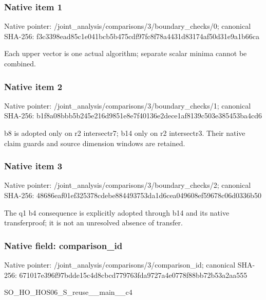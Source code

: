 \documentclass[10pt,a4paper]{article}
\begin{document}
\subsubsection{Native item 1}
Native pointer: /joint\_\allowbreak{}analysis/comparisons/3/boundary\_\allowbreak{}checks/0; canonical SHA-256: f3c3398ead85c1e041bcb5b475cdf97fc8f78a4431d83174af50d31e9a1b66ca

\begingroup\raggedright\sloppy Each upper vector is one actual algorithm;\allowbreak{} separate scalar minima cannot be combined.\par\endgroup

\subsubsection{Native item 2}
Native pointer: /joint\_\allowbreak{}analysis/comparisons/3/boundary\_\allowbreak{}checks/1; canonical SHA-256: b1f8a08bbb5b245e216d9851e8e7f40136e2dece1af8139c503e385453ba4cd6

\begingroup\raggedright\sloppy b8 is adopted only on r2 intersectr7;\allowbreak{} b14 only on r2 intersectr3. Their native claim guards and source dimension windows are retained.\par\endgroup

\subsubsection{Native item 3}
Native pointer: /joint\_\allowbreak{}analysis/comparisons/3/boundary\_\allowbreak{}checks/2; canonical SHA-256: 48686eaf01ef325378cdebe884493753da1d6cea049608ef59678c06d0336b50

\begingroup\raggedright\sloppy The q1 b4 consequence is explicitly adopted through b14 and its native transferproof;\allowbreak{} it is not an unresolved absence of transfer.\par\endgroup

\subsubsection{Native field: comparison\_\allowbreak{}id}
Native pointer: /joint\_\allowbreak{}analysis/comparisons/3/comparison\_\allowbreak{}id; canonical SHA-256: 671017e396f97bdde15c4d8cbcd779763fda9727a4e0778f88bb72b53a2aa555

\begingroup\raggedright\sloppy SO\_\allowbreak{}HO\_\allowbreak{}HOS06\_\allowbreak{}S\_\allowbreak{}reuse\_\allowbreak{}\_\allowbreak{}main\_\allowbreak{}\_\allowbreak{}c4\par\endgroup
\end{document}
